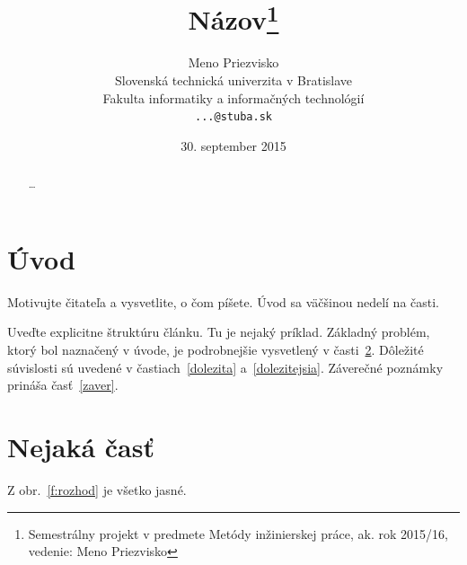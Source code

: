 \documentclass[10pt,twoside,slovak,a4paperr]{coursepaper}
\title{Názov\thanks{Semestrálny projekt v predmete Metódy inžinierskej práce, ak. rok 2015/16, vedenie: Meno Priezvisko}} %
\author{Meno Priezvisko\\[2pt]
	{\small Slovenská technická univerzita v Bratislave}\\
	{\small Fakulta informatiky a informačných technológií}\\
	{\small \texttt{...@stuba.sk}}
	}
\date{\small 30. september 2015} %
\begin{document}
\maketitle

\begin{abstract}
\ldots
\end{abstract}



\section{Úvod}

Motivujte čitateľa a vysvetlite, o čom píšete. Úvod sa väčšinou nedelí na časti.

Uveďte explicitne štruktúru článku. Tu je nejaký príklad.
Základný problém, ktorý bol naznačený v úvode, je podrobnejšie vysvetlený v časti~\ref{nejaka}.
Dôležité súvislosti sú uvedené v častiach~\ref{dolezita} a~\ref{dolezitejsia}.
Záverečné poznámky prináša časť~\ref{zaver}.



\section{Nejaká časť} \label{nejaka}

Z obr.~\ref{f:rozhod} je všetko jasné. 
\end{document}
